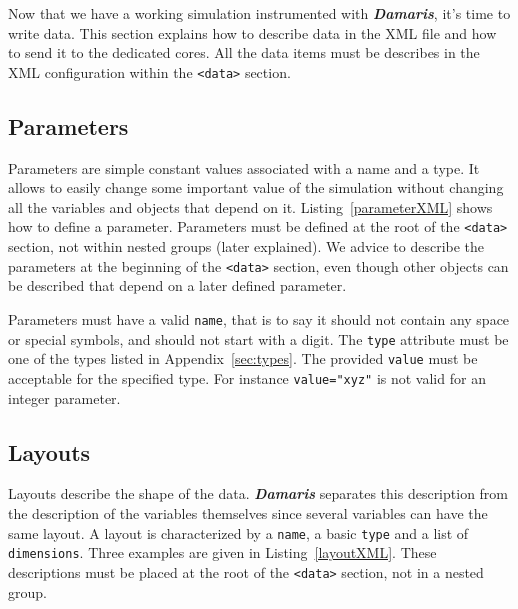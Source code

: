 \documentclass[11pt]{report}
\newcommand{\Damaris}{\emph{\textbf{Damaris}}}
\begin{document}
Now that we have a working simulation instrumented with \Damaris{}, it's time to write data.
This section explains how to describe data in the XML file and how to send it to the dedicated cores.
All the data items must be describes in the XML configuration within the \texttt{<data>} section.

\subsection{Parameters}

Parameters are simple constant values associated with a name and a type. It allows to
easily change some important value of the simulation without changing all the variables
and objects that depend on it. Listing~\ref{parameterXML} shows how to define a parameter.
Parameters must be defined at the root of the \texttt{<data>}  section, not within nested groups
(later explained). We advice to describe the parameters at the beginning of the \texttt{<data>}  section,
even though other objects can be described that depend on a later defined parameter.

\noindent\begin{minipage}{\textwidth}
\vspace{0.5cm}

\end{minipage}

Parameters must have a valid \texttt{name}, that is to say it should not contain any space or special symbols,
and should not start with a digit. The \texttt{type} attribute must be one of the types listed in 
Appendix~\ref{sec:types}. The provided \texttt{value} must be acceptable for the specified type. For instance
\texttt{value="xyz"} is not valid for an integer parameter. 

\subsection{Layouts}

Layouts describe the shape of the data. \Damaris{} separates this description from the description
of the variables themselves since several variables can have the same layout.
A layout is characterized by a \texttt{name}, a basic \texttt{type} and a list of \texttt{dimensions}.
Three examples are given in Listing~\ref{layoutXML}. These descriptions
must be placed at the root of the \texttt{<data>} section, not in a nested group.
\end{document}
